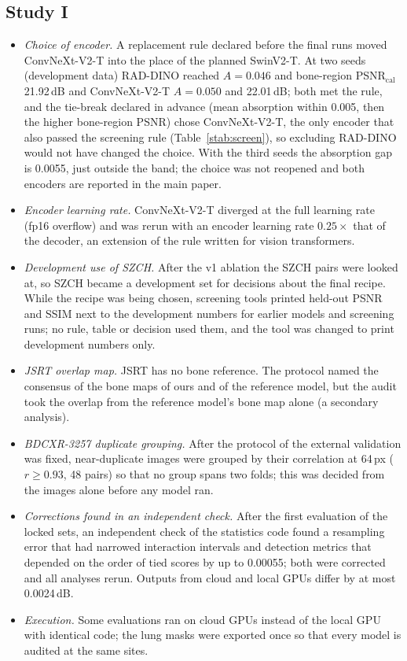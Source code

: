 \documentclass[journal]{IEEEtran}
\begin{document}
\subsection{Study I}
\begin{itemize}
\item \emph{Choice of encoder.} A replacement rule declared before the final runs moved ConvNeXt-V2-T into the place of the planned
 SwinV2-T. At two seeds (development data) RAD-DINO reached $A=0.046$ and bone-region PSNR$_{\mathrm{cal}}$ 21.92\,dB and
 ConvNeXt-V2-T $A=0.050$ and 22.01\,dB; both met the rule, and the tie-break declared in advance (mean absorption within 0.005, then the
 higher bone-region PSNR) chose ConvNeXt-V2-T, the only encoder that also passed the screening rule (Table~\ref{stab:screen}), so excluding
 RAD-DINO would not have changed the choice. With the third seeds the absorption gap is 0.0055, just outside the band; the choice was not
 reopened and both encoders are reported in the main paper.
\item \emph{Encoder learning rate.} ConvNeXt-V2-T diverged at the full learning rate (fp16 overflow) and was rerun with an encoder learning
 rate $0.25\times$ that of the decoder, an extension of the rule written for vision transformers.
\item \emph{Development use of SZCH.} After the v1 ablation the SZCH pairs were looked at, so SZCH became a development set for decisions
 about the final recipe. While the recipe was being chosen, screening tools printed held-out PSNR and SSIM next to the development
 numbers for earlier models and screening runs; no rule, table or decision used them, and the tool was changed to print development
 numbers only.
\item \emph{JSRT overlap map.} JSRT has no bone reference. The protocol named the consensus of the bone maps of ours and of the reference
 model, but the audit took the overlap from the reference model's bone map alone (a secondary analysis).
\item \emph{BDCXR-3257 duplicate grouping.} After the protocol of the external validation was fixed, near-duplicate images were grouped
 by their correlation at 64\,px ($r\ge0.93$, 48 pairs) so that no group spans two folds; this was decided from the images alone before
 any model ran.
\item \emph{Corrections found in an independent check.} After the first evaluation of the locked sets, an independent check of the
 statistics code found a resampling error that had narrowed interaction intervals and detection metrics that depended on the order of tied
 scores by up to 0.00055; both were corrected and all analyses rerun. Outputs from cloud and local GPUs differ by at most 0.0024\,dB.
\item \emph{Execution.} Some evaluations ran on cloud GPUs instead of the local GPU with identical code; the lung masks were exported once
 so that every model is audited at the same sites.
\end{itemize}
\end{document}
